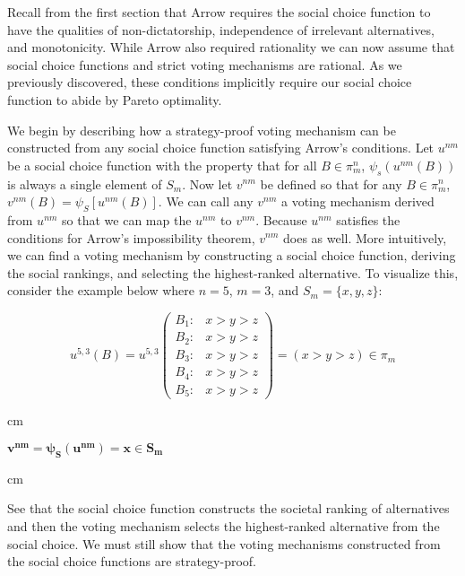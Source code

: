 \documentclass{amsart}
\theoremstyle{plain}
\begin{document}
Recall from the first section that Arrow requires the social choice function to have the qualities of non-dictatorship, independence of irrelevant alternatives, and monotonicity. While Arrow also required rationality we can now assume that social choice functions and strict voting mechanisms are rational. As we previously discovered, these conditions implicitly require our social choice function to abide by Pareto optimality. 

We begin by describing how a strategy-proof voting mechanism can be constructed from any social choice function satisfying Arrow's conditions. Let $u^{nm}$ be a social choice function with the property that for all $B \in \pi_m^n$, $\psi_s(u^{nm}(B))$ is always a single element of $S_m$. Now let $v^{nm}$ be defined so that for any $B \in \pi_m^n$, $v^{nm}(B) = \psi_S[u^{nm}(B)]$. We can call any $v^{nm}$ a voting mechanism derived from $u^{nm}$ so that we can map the $u^{nm}$ to $v^{nm}$. Because $u^{nm}$ satisfies the conditions for Arrow's impossibility theorem, $v^{nm}$ does as well. More intuitively, we can find a voting mechanism by constructing a social choice function, deriving the social rankings, and selecting the highest-ranked alternative. To visualize this, consider the example below where $n = 5$, $m = 3$, and $S_m = \{x, y, z\}$:

\begin{equation*}
  u^{5,3}(B) = u^{5,3}\left(
    \begin{array}{cc}
      B_1: & \text{$x > y > z$}\\
      B_2: & \text{$x > y > z$}\\
      B_3: & \text{$x > y > z$}\\
      B_4: & \text{$x > y > z$}\\ 
      B_5: & \text{$x > y > z$}
    \end{array} 
    \right) = (x > y > z) \in \pi_m
\end{equation*}

 cm

\begin{center}
    $\mathbf{v^{nm} = \psi_S(u^{nm}) = x \in S_m}$
\end{center}

 cm

\noindent See that the social choice function constructs the societal ranking of alternatives and then the voting mechanism selects the highest-ranked alternative from the social choice. We must still show that the voting mechanisms constructed from the social choice functions are strategy-proof.
\end{document}

